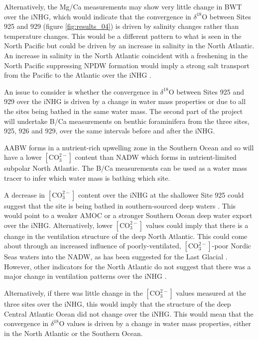 Alternatively, the Mg/Ca measurements may show very little change in BWT over the iNHG, which would indicate that the convergence in $\delta^{18}\text{O}$ between Sites 925 and 929 (figure \ref{fig:results_04}) is driven by salinity changes rather than temperature changes. This would be a different pattern to what is seen in the North Pacific but could be driven by an increase in salinity in the North Atlantic. An increase in salinity in the North Atlantic coincident with a freshening in the North Pacific suppressing NPDW formation would imply a strong salt transport from the Pacific to the Atlantic over the iNHG \citep{woodardAntarcticRoleNorthern2014}. 

An issue to consider is whether the convergence in $\delta^{18}\text{O}$ between Sites 925 and 929 over the iNHG is driven by a change in water mass properties or due to all the sites being bathed in the same water mass. The second part of the project will undertake B/Ca measurements on benthic foraminifera from the three sites, 925, 926 and 929, over the same intervals before and after the iNHG. 

AABW forms in a nutrient-rich upwelling zone in the Southern Ocean and so will have a lower $\left[ \text{CO}_3^{2-}\right]$ content than NADW which forms in nutrient-limited subpolar North Atlantic. The B/Ca measurements can be used as a water mass tracer to infer which water mass is bathing which site. 

A decrease in $\left[ \text{CO}_3^{2-}\right]$ content over the iNHG at the shallower Site 925 could suggest that the site is being bathed in southern-sourced deep waters \citep{langIncursionsSouthernsourcedWater2016}. This would point to a weaker AMOC or a stronger Southern Ocean deep water export over the iNHG.  Alternatively, lower $\left[ \text{CO}_3^{2-}\right]$ values could imply that there is a change in the ventilation structure of the deep North Atlantic. This could come about through an increased influence of poorly-ventilated, $\left[ \text{CO}_3^{2-}\right]$-poor Nordic Seas waters into the NADW, as has been suggested for the Last Glacial \citep{larkinActiveNordicSeas2022}. However, other indicators for the North Atlantic do not suggest that there was a major change in ventilation patterns over the iNHG \citep{drautClimateStabilityPliocene2003}.

Alternatively, if there was little change in the $\left[ \text{CO}_3^{2-}\right]$ values measured at the three sites over the iNHG, this would imply that the structure of the deep Central Atlantic Ocean did not change over the iNHG. This would mean that the convergence in $\delta^{18}\text{O}$ values is driven by a change in water mass properties, either in the North Atlantic or the Southern Ocean.

